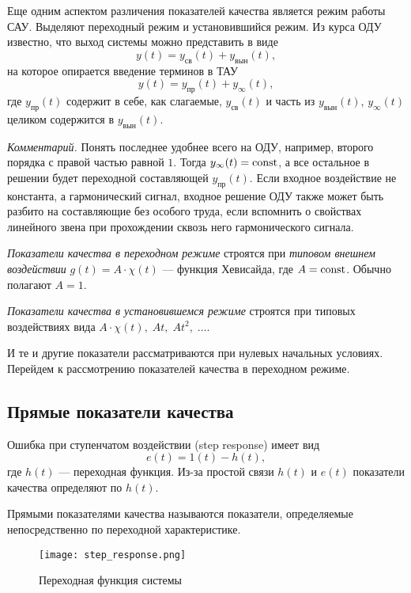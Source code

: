 \documentclass[../../TAU.tex]{subfiles}
\begin{document}
    Еще одним аспектом различения показателей качества является режим работы САУ. Выделяют переходный режим и установившийся режим.
    Из курса ОДУ известно, что выход системы можно представить в виде
    $$
        y(t) = y_\text{св}(t) + y_\text{вын}(t),
    $$
    на которое опирается введение терминов в ТАУ
    $$
        y(t) = y_\text{пр}(t) + y_{\infty}(t),
    $$
    где $y_\text{пр}(t)$ содержит в себе, как слагаемые,  $y_\text{св}(t)$ и часть из $y_\text{вын}(t)$, $y_{\infty}(t)$ целиком содержится в $y_\text{вын}(t)$.

    \textit{Комментарий.} Понять последнее удобнее всего на ОДУ, например, второго порядка с правой частью равной $1$. Тогда $y_{\infty}(t)=\mathop{\mathrm{const}}\nolimits$, а все остальное в решении будет переходной составляющей $y_\text{пр}(t)$. Если входное воздействие не константа, а гармонический сигнал, входное решение ОДУ
    также может быть разбито на составляющие без особого труда, если вспомнить о свойствах линейного звена при прохождении сквозь него гармонического сигнала.

    {\it Показатели качества в переходном режиме} строятся при {\it типовом внешнем воздействии} $g(t) = A\cdot\chi(t)$ --- функция Хевисайда, где $A=\mathop{\mathrm{const}}\nolimits$. Обычно полагают $A=1$.

    {\it Показатели качества в установившемся режиме} строятся при типовых воздействиях вида $A\cdot\chi(t),\; At,\; At^2,\; \ldots$.

    И те и другие показатели рассматриваются при нулевых начальных условиях. Перейдем к рассмотрению показателей качества в переходном режиме.

\subsection{Прямые показатели качества}

    Ошибка при ступенчатом воздействии (step response) имеет вид
    $$
        e(t) = 1(t) - h(t),
    $$
    где $h(t)$ --- переходная функция. Из-за простой связи $h(t)$ и $e(t)$ показатели качества определяют по $h(t)$.
    \begin{defi}
        Прямыми показателями качества называются показатели, определяемые непосредственно по переходной характеристике.
    \end{defi}

    \begin{figure}[h]
        \centering
        \texttt{[image: step\_response.png]}
        \centering
        \caption{Переходная функция системы}
        \label{FIG2}
    \end{figure}
\end{document}
